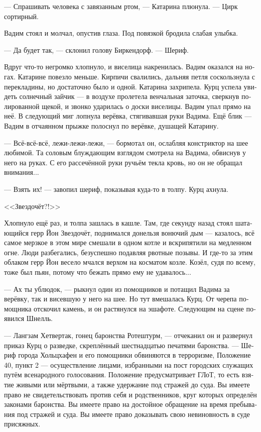 \documentclass[a4paper,12pt,fleqn]{book}\usepackage{polyglossia}\setdefaultlanguage[babelshorthands=true]{russian}\setotherlanguage{english}\defaultfontfeatures{Ligatures=TeX,Mapping=tex-text}\usepackage{xcolor}\newcommand{\ml}[3]{#2}
\newcommand{\textspace}{\vspace{1em}{\centering\Large\bfseries<...>\par}\vspace{1em}}
\begin{document}
--- Спрашивать человека с завязанным ртом, --- Катарина плюнула.
--- Цирк сортирный.

Вадим стоял и молчал, опустив глаза.
Под повязкой бродила слабая улыбка.

--- Да будет так, --- склонил голову Биркендорф.
\ml{$0$}
{--- Шериф.}
{``Scherif.''}

\textspace

Вдруг что-то негромко хлопнуло, и виселица накренилась.
Вадим оказался на ногах.
Катарине повезло меньше.
Кирпичи свалились, дальняя петля соскользнула с перекладины, но достаточно было и одной.
Катарина захрипела.
Курц успела увидеть солнечный зайчик --- в воздухе пролетела венчальная заточка, сверкнув полированной щекой, и звонко ударилась о доски виселицы.
Вадим упал прямо на неё.
В следующий миг лопнула верёвка, стягивавшая руки Вадима.
Ещё блик --- Вадим в отчаянном прыжке полоснул по верёвке, душащей Катарину.

--- Всё-всё-всё, лежи-лежи-лежи, --- бормотал он, ослабляя констриктор на шее любимой.
Та соловым блуждающим взглядом смотрела на Вадима, обвиснув у него на руках.
С его рассечённой руки ручьём текла кровь, но он не обращал внимания...

--- Взять их! --- завопил шериф, показывая куда-то в толпу.
Курц ахнула.

\ml{$0$}
{<<Звездочёт?!>>}
{\textit{Stargazer?}}

Хлопнуло ещё раз, и толпа зашлась в кашле.
Там, где секунду назад стоял шатающийся герр Йон Звездочёт, поднимался донельзя вонючий дым --- казалось, всё самое мерзкое в этом мире смешали в одном котле и вскрипятили на медленном огне.
Люди разбегались, безуспешно подавляя рвотные позывы.
И где-то за этим облаком герр Йон весело мчался верхом на косматом козле.
Козёл, судя по всему, тоже был пьян, потому что бежать прямо ему не удавалось...

--- Ах ты ублюдок, --- рыкнул один из помощников и потащил Вадима за верёвку, так и висевшую у него на шее.
Но тут вмешалась Курц.
От черепа помощника отскочил камень, и он растянулся на эшафоте.
Следующим на сцене появился Шнелль.

--- Лангзам Хетвертак, гонец баронства Ротештурм, --- отчеканил он и развернул приказ Курц о разведке, скреплённый шестнадцатью печатями баронства.
--- Шериф города Хольцхафен и его помощники обвиняются в терроризме, Положение 40, пункт 2 --- осуществление лицами, избранными на пост городских служащих путём всенародного голосования.
\ml{$0$}
{Положение предусматривает ГЛоТ, то есть взятие живыми или мёртвыми, а также удержание под стражей до суда.}
{This Provision provides for GLoT, \textit{id est} Dead or Alive Capture, along with pre-trial detention.}
Вы имеете право не свидетельствовать против себя и родственников, круг которых определён законами баронства.
Вы имеете право на достойное обращение на время пребывания под стражей и суда.
\ml{$0$}
{Вы имеете право доказывать свою невиновность в суде присяжных.}
{You have the right to prove your innocence in the Assize Court.''}
\end{document}
